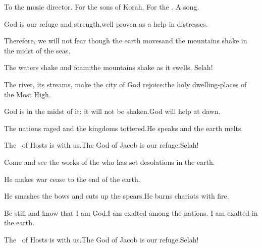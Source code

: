 
\begin{inparaenum}
  \noindent{} To the music director. For the sons of Korah. For the . A song.\smallskip%

  \pb{} God is our refuge and strength,\pa{}well proven as a help in distresses.%

  \pb{} Therefore, we will not fear though the earth moves\pa{}and the mountains shake in the midst of the seas.%

  \pb{} The waters shake and foam;\pa{}the mountains shake as it swells.%
  \pa{}Selah!%

  \pc{} The river,%
  its streams, make%
  the city of God rejoice:\pa{}the holy dwelling-places of the Most High.%

  \pb{} God is in the midst of it: it will not be shaken.\pa{}God will help at dawn.%

  \pb{} The nations raged and the kingdoms tottered.\pa{}He speaks and the earth melts.%

  \pb{} The \lord\ of Hosts is with us.\pa{}The God of Jacob is our refuge.\pa{}Selah!%

  \pc{} Come and see the works of the \lord%
  \pa{}who has set desolations in the earth.%

  \pb{} He makes war cease to the end of the earth.%

  \pc{}He smashes the bows and cuts up the spears.\pa{}He burns chariots%
  with fire.%

  \pb{} Be still and know that I am God.\pa{}I am exalted among the nations. I am exalted in the earth.%

  \pb{} The \lord\ of Hosts is with us.\pa{}The God of Jacob is our refuge.\pa{}Selah!%
\end{inparaenum}
